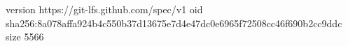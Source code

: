 version https://git-lfs.github.com/spec/v1
oid sha256:8a078affa924b4c550b37d13675e7d4e47dc0e6965f72508cc46f690b2cc9ddc
size 5566
